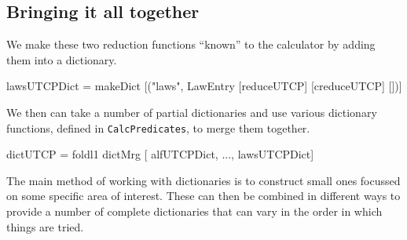 \subsection{Bringing it all together}

We make these two reduction functions ``known'' to the calculator
by adding them into a dictionary.
\begin{code}
lawsUTCPDict
 = makeDict [("laws", LawEntry [reduceUTCP] [creduceUTCP] [])]
\end{code}
We then can take a number of partial dictionaries and use various
dictionary functions,
defined in \texttt{CalcPredicates}, to merge them together.
\begin{code}
dictUTCP = foldl1 dictMrg [ alfUTCPDict, ..., lawsUTCPDict]
\end{code}
The main method of working with dictionaries
is to construct small ones
focussed on some specific area of interest.
These can then be combined in different ways to provide a number of complete
dictionaries that can vary in the order in which things are tried.









